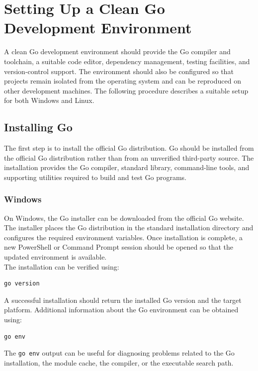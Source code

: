 \section{Setting Up a Clean Go Development Environment}

A clean Go development environment should provide the Go compiler and toolchain, a suitable code editor, dependency management, testing facilities, and version-control support. The environment should also be configured so that projects remain isolated from the operating system and can be reproduced on other development machines. The following procedure describes a suitable setup for both Windows and Linux.

\subsection{Installing Go}

The first step is to install the official Go distribution. Go should be installed from the official Go distribution rather than from an unverified third-party source. The installation provides the Go compiler, standard library, command-line tools, and supporting utilities required to build and test Go programs.

\subsubsection{Windows}

On Windows, the Go installer can be downloaded from the official Go website. The installer places the Go distribution in the standard installation directory and configures the required environment variables. Once installation is complete, a new PowerShell or Command Prompt session should be opened so that the updated environment is available.\\

The installation can be verified using:

\begin{lstlisting}
go version
\end{lstlisting}

A successful installation should return the installed Go version and the target platform. Additional information about the Go environment can be obtained using:

\begin{lstlisting}
go env
\end{lstlisting}

The \texttt{go env} output can be useful for diagnosing problems related to the Go installation, the module cache, the compiler, or the executable search path.

